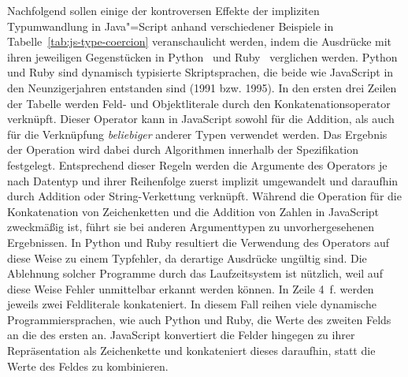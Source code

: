 Nachfolgend sollen einige der kontroversen Effekte der impliziten Typumwandlung in Java"=Script anhand verschiedener Beispiele in Tabelle~\ref{tab:js-type-coercion} veranschaulicht werden, indem die Ausdrücke mit ihren jeweiligen Gegenstücken in Python~\autocite{PYTHON3} und Ruby~\autocite{RUBY} verglichen werden. Python und Ruby sind dynamisch typisierte Skriptsprachen, die beide wie JavaScript in den Neunzigerjahren entstanden sind (1991 bzw. 1995).
In den ersten drei Zeilen der Tabelle werden Feld- und Objektliterale durch den Konkatenationsoperator \code{+} verknüpft. Dieser Operator kann in JavaScript sowohl für die Addition, als auch für die Verknüpfung \emph{beliebiger} anderer Typen verwendet werden. Das Ergebnis der Operation wird dabei durch Algorithmen innerhalb der Spezifikation~\autocite[220]{ECMASCRIPT:2019} festgelegt. Entsprechend dieser Regeln werden die Argumente des Operators je nach Datentyp und ihrer Reihenfolge zuerst implizit umgewandelt und daraufhin durch Addition oder String-Verkettung verknüpft. Während die Operation für die Konkatenation von Zeichenketten und die Addition von Zahlen in JavaScript zweckmäßig ist, führt sie bei anderen Argumenttypen zu unvorhergesehenen Ergebnissen. In Python und Ruby resultiert die Verwendung des Operators auf diese Weise zu einem Typfehler, da derartige Ausdrücke ungültig sind. Die Ablehnung solcher Programme durch das Laufzeitsystem ist nützlich, weil auf diese Weise Fehler unmittelbar erkannt werden können.
In Zeile 4~f. werden jeweils zwei Feldliterale konkateniert. In diesem Fall reihen viele dynamische Programmiersprachen, wie auch Python und Ruby, die Werte des zweiten Felds an die des ersten an. JavaScript konvertiert die Felder hingegen zu ihrer Repräsentation als Zeichenkette und konkateniert dieses daraufhin, statt die Werte des Feldes zu kombinieren.





